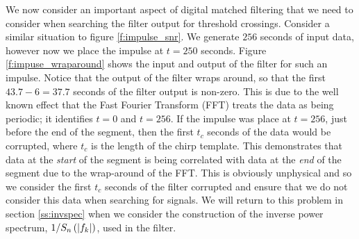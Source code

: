 We now consider an important aspect of digital matched filtering that we need
to consider when searching the filter output for threshold crossings. Consider
a similar situation to figure \ref{f:impulse_snr}. We generate $256$ seconds of
input data, however now we place the impulse at $t = 250$ seconds. Figure
\ref{f:impuse_wraparound} shows the input and output of the filter for such an
impulse. Notice that the output of the filter wraps around, so that the first 
$43.7-6 = 37.7$ seconds of the filter output is non-zero. This is due to the
well known effect that the Fast Fourier Transform (FFT) treats the data as being
periodic; it identifies $t=0$ and $t=256$\cite{fftbook}. If the impulse was
place at $t=256$, just before the end of the segment, then the first $t_c$
seconds of the data would be corrupted, where $t_c$ is the length of the chirp
template. This demonstrates that data at the \emph{start} of the segment is
being correlated with data at the \emph{end} of the segment due to the
wrap-around of the FFT. This is obviously unphysical and so we consider the
first $t_c$ seconds of the filter corrupted and ensure that we do not consider
this data when searching for signals. We will return to this problem in section
\ref{ss:invspec} when we consider the construction of the inverse power
spectrum, $1/S_n\left(\left|f_{k}\right|\right)$, used in the filter.

